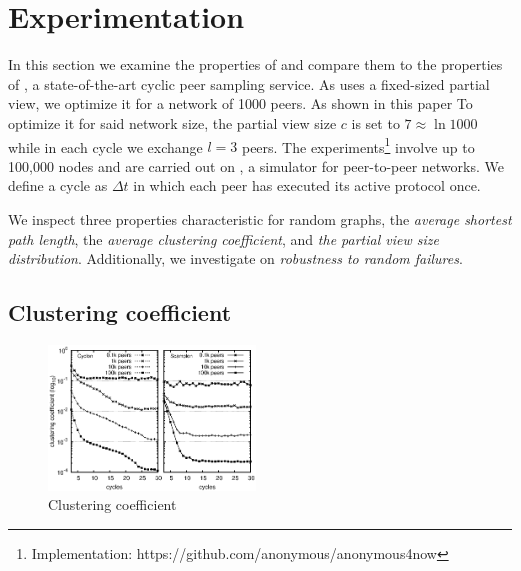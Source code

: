 
\section{Experimentation}
\label{sec:experiments}
In this section we examine the properties of \SCAMPLON{} and 
compare them to the properties of \CYCLON{}, a state-of-the-art cyclic peer sampling service.
As \CYCLON{} uses a fixed-sized partial view, we optimize it for a network of 1000 peers.
As shown in this paper\cite{erdos1959random}
To optimize it for said network size, the partial view size $c$ is set to $7\approx \ln{1000}$
while in each cycle we exchange $l=3$ peers.
The experiments\footnote{Implementation: https://github.com/anonymous/anonymous4now}
involve up to 100,000 nodes and are carried out on \PEERSIM{} \cite{peersim}, 
a simulator for peer-to-peer networks.
We define a cycle as $\Delta t$ in which each peer has executed its active protocol once.

We inspect three properties characteristic for random graphs, 
the \emph{average shortest path length}, the \emph{average clustering coefficient},
and \emph{the partial view size distribution}. Additionally, we investigate on
\emph{robustness to random failures}.

\subsection{Clustering coefficient}

\begin{figure}
    \centering
    \includegraphics[width=0.49\textwidth]{img/cluster.eps}
    \caption{Clustering coefficient}
    \label{fig:clustering}
\end{figure}


